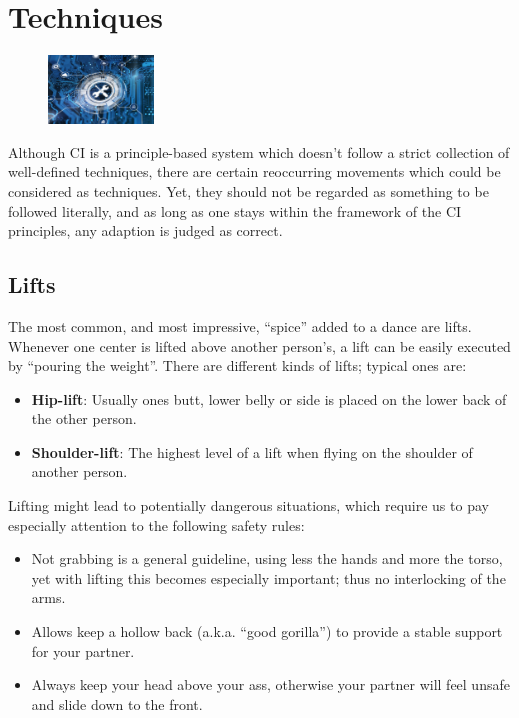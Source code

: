 \section{Techniques}\label{sec:techniques}

\begin{figure}
    \centering
    \includegraphics[width=0.25\textwidth]{images/techniques}
\end{figure}

Although CI is a principle-based system which doesn't follow a strict collection of well-defined techniques, there are certain reoccurring movements which could be considered as techniques.
Yet, they should not be regarded as something to be followed literally, and as long as one stays within the framework of the CI principles, any adaption is judged as correct.

\subsection{Lifts}\label{subsec:lifts}

The most common, and most impressive, ``spice'' added to a dance are lifts.
Whenever one center is lifted above another person's, a lift can be easily executed by ``pouring the weight''.
There are different kinds of lifts; typical ones are:

\begin{itemize}
    \item \textbf{Hip-lift}: Usually ones butt, lower belly or side is placed on the lower back of the other person.
    \item \textbf{Shoulder-lift}: The highest level of a lift when flying on the shoulder of another person.
\end{itemize}

Lifting might lead to potentially dangerous situations, which require us to pay especially attention to the following safety rules:

\begin{itemize}
    \item Not grabbing is a general guideline, using less the hands and more the torso, yet with lifting this becomes especially important; thus no interlocking of the arms.
    \item Allows keep a hollow back (a.k.a. ``good gorilla'') to provide a stable support for your partner.
    \item Always keep your head above your ass, otherwise your partner will feel unsafe and slide down to the front.
\end{itemize}

